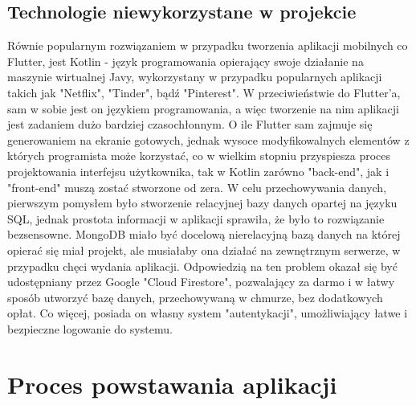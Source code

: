 \documentclass[12pt, a4paper]{article}
\begin{document}
\begin{sloppypar}
{  \subsection{Technologie niewykorzystane w projekcie}
  {
    Równie popularnym rozwiązaniem w przypadku tworzenia aplikacji mobilnych co Flutter, jest Kotlin -
    język programowania opierający swoje działanie na maszynie wirtualnej Javy, wykorzystany w przypadku
    popularnych aplikacji takich jak "Netflix", "Tinder", bądź "Pinterest". W przeciwieństwie do
    Flutter'a, sam w sobie jest on językiem programowania, a więc tworzenie na nim aplikacji jest
    zadaniem dużo bardziej czasochłonnym. O ile Flutter sam zajmuje się generowaniem na ekranie
    gotowych, jednak wysoce modyfikowalnych elementów z których programista może korzystać, co w
    wielkim stopniu przyspiesza proces projektowania interfejsu użytkownika, tak w Kotlin
    zarówno "back-end", jak i "front-end" muszą zostać stworzone od zera. W celu przechowywania
    danych, pierwszym pomysłem było stworzenie relacyjnej bazy danych opartej na języku SQL, jednak
    prostota informacji w aplikacji sprawiła, że było to rozwiązanie bezsensowne.
    MongoDB miało być docelową nierelacyjną bazą danych na której opierać się miał projekt, ale
    musiałaby ona działać na zewnętrznym serwerze, w przypadku chęci wydania aplikacji. Odpowiedzią
    na ten problem okazał się być udostępniany przez Google "Cloud Firestore", pozwalający za darmo i 
    w łatwy sposób utworzyć bazę danych, przechowywaną w chmurze, bez dodatkowych opłat. Co więcej,
    posiada on własny system "autentykacji", umożliwiający łatwe i bezpieczne logowanie do systemu.
  }
}

\section{Proces powstawania aplikacji}
{
}
\end{sloppypar}
\end{document}
